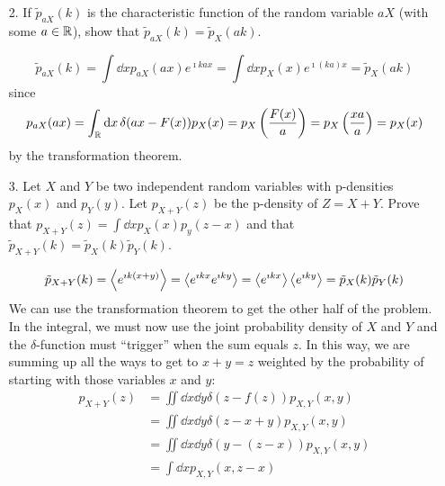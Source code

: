 \documentclass[a4paper,twoside]{article}
\begin{document}
\begin{itemize}
\begin{problem}
        \end{problem}
    \item[2.] If $ \tilde{p}_{aX}(k) $ is the characteristic function of the random variable $ aX $ (with some $ a \in \mathbb{R} $), show that $ \tilde{p}_{aX}(k) = \tilde{p}_X(ak) $.
        \begin{problem}
            \begin{equation}
                \tilde{p}_{aX}(k) = \int \dd{x} p_{aX}(ax) e^{\imath k ax} = \int \dd{x} p_{X}(x) e^{\imath (ka) x} = \tilde{p}_{X}(ak)
            \end{equation}
            since
            \begin{equation}
                p_{aX}(ax) = \int_{\mathbb{R}} \dd{x} \delta(ax - F(x)) p_X(x) = p_X\left( \frac{F(x)}{a} \right) = p_X\left( \frac{xa}{a} \right) = p_X(x)
            \end{equation}
            by the transformation theorem.
        \end{problem}
    \item[3.] Let $ X $ and $ Y $ be two independent random variables with p-densities $ p_X(x) $ and $ p_Y(y) $. Let $ p_{X+Y}(z) $ be the p-density of $ Z = X + Y $. Prove that $ p_{X+Y}(z) = \int \dd{x} p_X(x) p_y(z-x) $ and that $ \tilde{p}_{X+Y}(k) = \tilde{p}_X(k) \tilde{p}_Y(k) $.
        \begin{problem}
            \begin{equation}
                \tilde{p}_{X+Y}(k) = \ev{e^{\imath k (x + y)}} = \ev{e^{\imath k x} e^{\imath k y}} = \ev{e^{\imath k x}} \ev{e^{\imath k y}} = \tilde{p}_{X}(k) \tilde{p}_{Y}(k)
            \end{equation}
            We can use the transformation theorem to get the other half of the problem. In the integral, we must now use the joint probability density of $ X $ and $ Y $ and the $\delta$-function must ``trigger'' when the sum equals $ z $. In this way, we are summing up all the ways to get to $ x + y = z $ weighted by the probability of starting with those variables $ x $ and $ y $:
            \begin{align}
                p_{X+Y}(z) &= \iint \dd{x} \dd{y} \delta(z - f(z)) p_{X,Y}(x,y) \\
                &= \iint \dd{x} \dd{y} \delta(z - x + y) p_{X,Y}(x,y) \\
                &= \iint \dd{x} \dd{y} \delta(y - (z - x)) p_{X,Y}(x,y) \\
                &= \int \dd{x} p_{X,Y}(x, z - x) \\

\end{align}
\end{problem}
\end{itemize}
\end{document}

